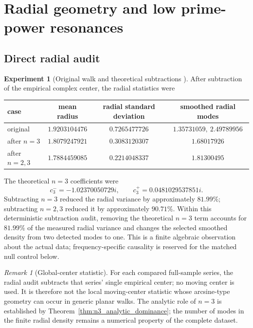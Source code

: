 \documentclass[11pt]{amsart}
\numberwithin{equation}{section}
\theoremstyle{plain}
\theoremstyle{definition}
\newtheorem{experiment}[theorem]{Experiment}
\theoremstyle{remark}
\newtheorem{remark}[theorem]{Remark}
\newcommand{\1}{\mathbf{1}}
\begin{document}
\section{Radial geometry and low prime-power resonances}
\label{sec:numerical_radial_geometry}

\subsection{Direct radial audit}
\label{subsec:direct_radial_audit}

\begin{experiment}[Original walk and theoretical subtractions {\normalfont[Numerical]}]
\label{exp:direct_radial_audit_detailed}
After subtraction of the empirical complex center, the radial statistics
were
\begin{center}
\begin{tabular}{lccc}
\toprule
case & mean radius & radial standard deviation & smoothed radial modes\\
\midrule
original & $1.9203104476$ & $0.7265477726$ & $1.35731059,\ 2.49789956$\\
after $n=3$ & $1.8079247921$ & $0.3083120307$ & $1.68017926$\\
after $n=2,3$ & $1.7884459085$ & $0.2214048337$ & $1.81300495$\\
\bottomrule
\end{tabular}
\end{center}
The theoretical $n=3$ coefficients were
\begin{equation}
c_3^-=-1.02370050729i,
\qquad
c_3^+=0.0481029537851i.
\label{eq:numerical_c3_coefficients_detailed}
\end{equation}
Subtracting $n=3$ reduced the radial variance by approximately
$81.99\%$; subtracting $n=2,3$ reduced it by approximately $90.71\%$.
Within this deterministic subtraction audit, removing the theoretical
$n=3$ term accounts for $81.99\%$ of the measured radial variance and changes
the selected smoothed density from two detected modes to one.  This is a
finite algebraic observation about the actual data; frequency-specific
causality is reserved for the matched null control below.
\end{experiment}


\begin{remark}[Global-center statistic]
\label{rem:global_center_radial_statistic}
For each compared full-sample series, the radial audit subtracts that
series' single empirical center; no moving center is used.  It is therefore
not the local moving-center statistic whose arcsine-type geometry can
occur in generic planar walks.  The analytic role of $n=3$ is established by
Theorem~\ref{thm:n3_analytic_dominance}; the number of modes in the finite
radial density remains a numerical property of the complete dataset.
\end{remark}
\end{document}
